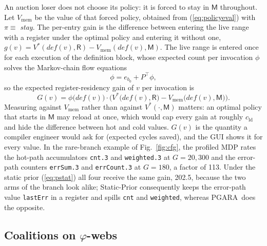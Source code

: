 \documentclass[conference]{IEEEtran}
\newcommand{\MG}{PGARA}
\newcommand{\Reg}{\mathsf{R}}
\newcommand{\Mem}{\mathsf{M}}
\newcommand{\cld}{c_{\mathrm{ld}}}
\newcommand{\tm}[1]{\texttt{#1}}
\begin{document}
An auction loser does not choose its policy: it is forced to stay in
$\Mem$ throughout. Let $V_{\mathrm{mem}}$ be the value of that forced
policy, obtained from (\ref{eq:policyeval}) with $\pi\equiv$ \emph{stay}.
The per-entry gain is the difference between entering the live range
with a register under the optimal policy and entering it without one,
$g(v)=V^\ast(\mathit{def}(v),\Reg)-V_{\mathrm{mem}}(\mathit{def}(v),\Mem)$.
The live range is entered once for each execution of the definition
block, whose expected count per invocation $\phi$ solves the
Markov-chain flow equations
\begin{equation}
\phi = e_{b_0} + P^{\top}\phi ,
\label{eq:freq}
\end{equation}
so the expected register-residency gain of $v$ per invocation is
\begin{equation}
G(v)=\phi\big(\mathit{def}(v)\big)\cdot
\Big(V^\ast\big(\mathit{def}(v),\Reg\big)-V_{\mathrm{mem}}\big(\mathit{def}(v),\Mem\big)\Big).
\label{eq:gain}
\end{equation}
Measuring against $V_{\mathrm{mem}}$ rather than against
$V^\ast(\cdot,\Mem)$ matters: an optimal policy that starts in $\Mem$
may reload at once, which would cap every gain at roughly $\cld$ and
hide the difference between hot and cold values.
$G(v)$ is the quantity a compiler engineer would ask for (expected
cycles saved), and the GUI shows it for every value. In the rare-branch
example of Fig.~\ref{fig:cfg}, the profiled MDP rates the hot-path
accumulators \tm{cnt.3} and \tm{weighted.3} at $G=20{,}300$ and the
error-path counters \tm{errSum.3} and \tm{errCount.3} at $G=180$, a
factor of 113. Under the static prior (\ref{eq:pstat}) all four receive
the same gain, 202.5, because the two arms of the branch look alike;
Static-Prior consequently keeps the error-path value \tm{lastErr} in a
register and spills \tm{cnt} and \tm{weighted}, whereas \MG\ does the
opposite.

\subsection{Coalitions on $\varphi$-webs}
\end{document}

